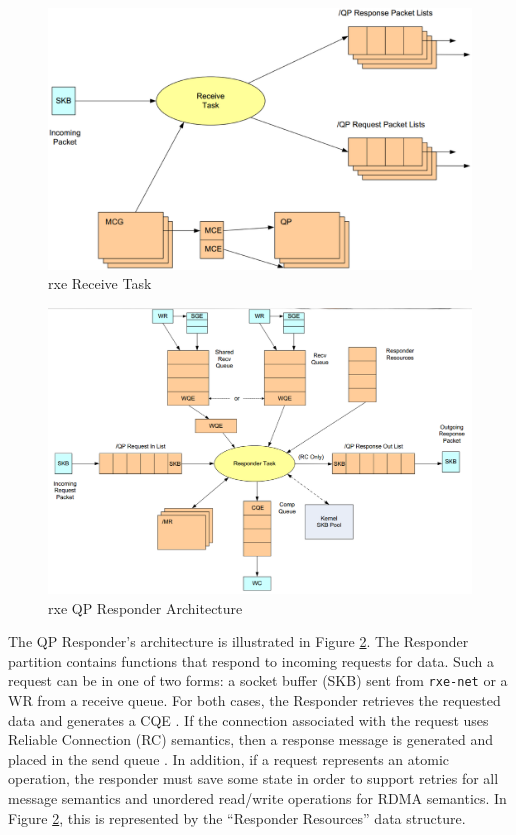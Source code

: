 \documentclass[11pt]{book}
\begin{document}
\begin{figure}[!t]
\includegraphics[width=\textwidth]{rxe_recv}
\caption{rxe Receive Task \protect\cite{pearson-10}}\label{rxe-recv}
\end{figure}

\begin{figure}[!t]
\includegraphics[width=\textwidth]{rxe_resp}
\caption{rxe QP Responder Architecture \protect\cite{pearson-10}}\label{rxe-resp}
\end{figure}

The QP Responder's architecture is illustrated in Figure \ref{rxe-resp}.  The Responder
partition contains functions that respond to incoming requests for data.  Such a request
can be in one of two forms: a socket buffer (SKB) sent from \verb;rxe-net; or a WR from a
receive queue.  For both cases, the Responder retrieves the requested data and generates a
CQE \cite{pearson-10}.  If the connection associated with the request uses Reliable
Connection (RC) semantics, then a response message is generated and placed in the send
queue \cite{InfiniBandTARoCE-10,pearson-10}.  In addition, if a request represents an
atomic operation, the responder must save some state in order to support retries for all
message semantics and unordered read/write operations for RDMA semantics.  In Figure
\ref{rxe-resp}, this is represented by the ``Responder Resources'' data structure.
\end{document}
